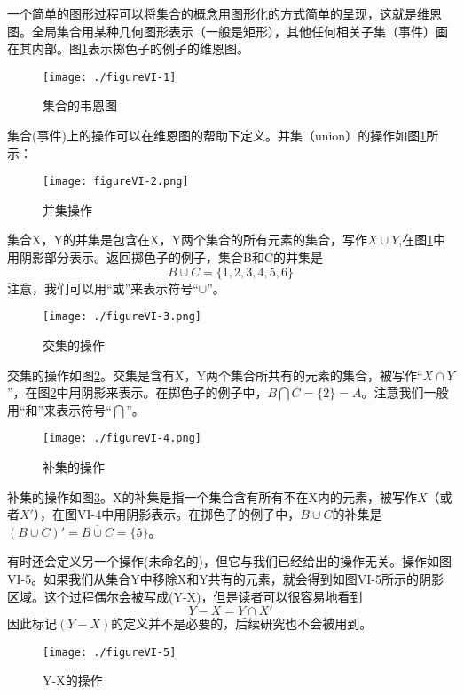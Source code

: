\documentclass[cn,11pt,chinese]{elegantbook}
\begin{document}
一个简单的图形过程可以将集合的概念用图形化的方式简单的呈现，这就是维恩图。全局集合用某种几何图形表示（一般是矩形），其他任何相关子集（事件）画在其内部。图\ref{fig:fig6_2}表示掷色子的例子的维恩图。


\begin{figure}[H]
	\texttt{[image: ./figureVI-1]}
	\caption{集合的韦恩图}
\end{figure}

集合(事件)上的操作可以在维恩图的帮助下定义。并集（union）的操作如图\ref{fig:fig6_2}所示：

\begin{figure}[H]
	\texttt{[image: figureVI-2.png]}
	\caption{并集操作}
	\label{fig:fig6_2}
\end{figure}

集合X，Y的并集是包含在X，Y两个集合的所有元素的集合，写作$X\cup Y$,在图\ref{fig:fig6_2}中用阴影部分表示。返回掷色子的例子，集合B和C的并集是
$$B\cup C=\{1,2,3,4,5,6\}$$
注意，我们可以用“或”来表示符号“$\cup$”。

\begin{figure}[H]
	\texttt{[image: ./figureVI-3.png]}
	\caption{交集的操作}
	\label{fig:fig6-3}
\end{figure}
交集的操作如图\ref{fig:fig6-3}。交集是含有X，Y两个集合所共有的元素的集合，被写作“$X\cap Y$”，在图\ref{fig:fig6-3}中用阴影来表示。在掷色子的例子中，$B\bigcap C=\{2\}=A$。注意我们一般用“和”来表示符号“$\bigcap$”。

\begin{figure}[H]
	\texttt{[image: ./figureVI-4.png]}
	\caption{补集的操作}
	\label{fig:fig6-4}
\end{figure}

补集的操作如图\ref{fig:fig6-4}。X的补集是指一个集合含有所有不在X内的元素，被写作$\overline X$（或者$X'$），在图VI-4中用阴影表示。在掷色子的例子中，$B\cup C$的补集是$(B\cup C)'=\overline{B\cup C}=\{5\}$。

有时还会定义另一个操作(未命名的)，但它与我们已经给出的操作无关。操作如图VI-5。如果我们从集合Y中移除X和Y共有的元素，就会得到如图VI-5所示的阴影区域。这个过程偶尔会被写成(Y-X)，但是读者可以很容易地看到
$$Y-X=Y\cap X'$$
因此标记$(Y-X)$的定义并不是必要的，后续研究也不会被用到。

\begin{figure}
	\texttt{[image: ./figureVI-5]}
	\caption{Y-X的操作}
	\label{fig:fig6-5}
\end{figure}
\end{document}

